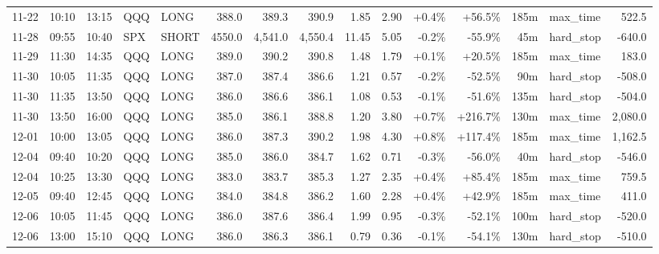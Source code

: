 \documentclass[11pt,a4paper,twoside]{article}
\begin{document}
\begin{landscape}
\begin{center}
\begin{longtable}{>{\color{txtmain}}l l l l l r r r r r r r r >{\color{txtmain}}l r}
11-22 & 10:10 & 13:15 & QQQ & LONG & 388.0 & 389.3 & 390.9 & 1.85 & 2.90 & \textcolor{wingreen}{+0.4\%} & \textcolor{wingreen}{+56.5\%} & 185m & max\_time & \textcolor{wingreen}{522.5} \\
11-28 & 09:55 & 10:40 & SPX & SHORT & 4550.0 & 4,541.0 & 4,550.4 & 11.45 & 5.05 & \textcolor{lossred}{-0.2\%} & \textcolor{lossred}{-55.9\%} & 45m & hard\_stop & \textcolor{lossred}{-640.0} \\
11-29 & 11:30 & 14:35 & QQQ & LONG & 389.0 & 390.2 & 390.8 & 1.48 & 1.79 & \textcolor{wingreen}{+0.1\%} & \textcolor{wingreen}{+20.5\%} & 185m & max\_time & \textcolor{wingreen}{183.0} \\
11-30 & 10:05 & 11:35 & QQQ & LONG & 387.0 & 387.4 & 386.6 & 1.21 & 0.57 & \textcolor{lossred}{-0.2\%} & \textcolor{lossred}{-52.5\%} & 90m & hard\_stop & \textcolor{lossred}{-508.0} \\
11-30 & 11:35 & 13:50 & QQQ & LONG & 386.0 & 386.6 & 386.1 & 1.08 & 0.53 & \textcolor{lossred}{-0.1\%} & \textcolor{lossred}{-51.6\%} & 135m & hard\_stop & \textcolor{lossred}{-504.0} \\
11-30 & 13:50 & 16:00 & QQQ & LONG & 385.0 & 386.1 & 388.8 & 1.20 & 3.80 & \textcolor{wingreen}{+0.7\%} & \textcolor{wingreen}{+216.7\%} & 130m & max\_time & \textcolor{wingreen}{2,080.0} \\
12-01 & 10:00 & 13:05 & QQQ & LONG & 386.0 & 387.3 & 390.2 & 1.98 & 4.30 & \textcolor{wingreen}{+0.8\%} & \textcolor{wingreen}{+117.4\%} & 185m & max\_time & \textcolor{wingreen}{1,162.5} \\
12-04 & 09:40 & 10:20 & QQQ & LONG & 385.0 & 386.0 & 384.7 & 1.62 & 0.71 & \textcolor{lossred}{-0.3\%} & \textcolor{lossred}{-56.0\%} & 40m & hard\_stop & \textcolor{lossred}{-546.0} \\
12-04 & 10:25 & 13:30 & QQQ & LONG & 383.0 & 383.7 & 385.3 & 1.27 & 2.35 & \textcolor{wingreen}{+0.4\%} & \textcolor{wingreen}{+85.4\%} & 185m & max\_time & \textcolor{wingreen}{759.5} \\
12-05 & 09:40 & 12:45 & QQQ & LONG & 384.0 & 384.8 & 386.2 & 1.60 & 2.28 & \textcolor{wingreen}{+0.4\%} & \textcolor{wingreen}{+42.9\%} & 185m & max\_time & \textcolor{wingreen}{411.0} \\
12-06 & 10:05 & 11:45 & QQQ & LONG & 386.0 & 387.6 & 386.4 & 1.99 & 0.95 & \textcolor{lossred}{-0.3\%} & \textcolor{lossred}{-52.1\%} & 100m & hard\_stop & \textcolor{lossred}{-520.0} \\
12-06 & 13:00 & 15:10 & QQQ & LONG & 386.0 & 386.3 & 386.1 & 0.79 & 0.36 & \textcolor{lossred}{-0.1\%} & \textcolor{lossred}{-54.1\%} & 130m & hard\_stop & \textcolor{lossred}{-510.0} \\

\end{longtable}
\end{center}
\end{landscape}
\end{document}
